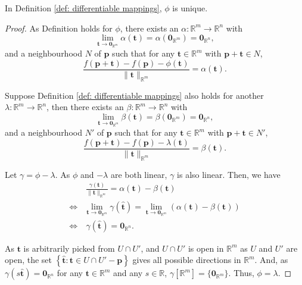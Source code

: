 \begin{theorem}
	\label{thm: differentiable mappings: uniqueness of phi}
	In Definition \ref{def: differentiable mappings}, $\phi$ is unique.
	
	\begin{proof}
		As Definition holds for $\phi$, there exists an $\alpha: \mathbb R^{m} \to \mathbb R^n$ with
		$$
		\lim_{\mathbf t \to \mathbf 0_{\mathbb R^m}} \alpha(\mathbf t) = \alpha(\mathbf 0_{\mathbb R^m}) = \mathbf 0_{\mathbb R^n},
		$$
		and a neighbourhood $N$ of $\mathbf p$ such that for any $\mathbf t \in \mathbb R^m$ with $\mathbf p + \mathbf t \in N$,
		$$
		\frac{f(\mathbf p + \mathbf t) - f(\mathbf p) - \phi(\mathbf t)}{\|\mathbf t\|_{\mathbb R^m}} = \alpha(\mathbf t).
		$$
	
		Suppose Definition \ref{def: differentiable mappings} also holds for another $\lambda: \mathbb R^m \to \mathbb R^n$, then
		there exists an $\beta: \mathbb R^m \to \mathbb R^n$ with
		$$
		\lim_{\mathbf t \to \mathbf 0_{\mathbb R^m}} \beta(\mathbf t) = \beta(\mathbf 0_{\mathbb R^m}) = \mathbf 0_{\mathbb R^n},
		$$
		and a neighbourhood $N'$ of $\mathbf p$ such that for any $\mathbf t \in \mathbb R^m$ with $\mathbf p + \mathbf t \in N'$,
		$$
		\frac{f(\mathbf p + \mathbf t) - f(\mathbf p) - \lambda(\mathbf t)}{\|\mathbf t\|_{\mathbb R^m}} = \beta(\mathbf t).
		$$
		
		Let $\gamma = \phi - \lambda$. As $\phi$ and $-\lambda$ are both linear, $\gamma$ is also linear. Then, we have
		$$
		\begin{aligned}
		& \ \frac{\gamma(\mathbf t)}{\| \mathbf t \|_{\mathbb R^m}} = \alpha(\mathbf t) - \beta(\mathbf t) \\
		\iff & \lim_{\mathbf t \to \mathbf 0_{\mathbb R^m}} \gamma(\mathbf{\hat t}) = \lim_{\mathbf t \to \mathbf 0_{\mathbb R^m}} (\alpha(\mathbf t) - \beta(\mathbf t)) \\
		\iff& \ \gamma(\mathbf{\hat t}) = \mathbf 0_{\mathbb R^n}.
		\end{aligned}		
		$$
		
		As $\mathbf t$ is arbitrarily picked from $U \cap U'$, and $U \cap U'$ is open in $\mathbb R^m$ as $U$ and $U'$ are open, the set $\left\{ \mathbf{\hat t} : \mathbf t \in U \cap U' - \mathbf p \right\}$ gives all possible directions in $\mathbb R^m$. And, as $\gamma(s \mathbf{\hat t}) = \mathbf 0_{\mathbb R^n}$ for any $\mathbf t \in \mathbb R^m$ and any $s \in \mathbb R$, $\gamma[\mathbb R^m] = \{\mathbf 0_{\mathbb R^m}\}$. Thus, $\phi = \lambda$.
	\end{proof}
\end{theorem}


